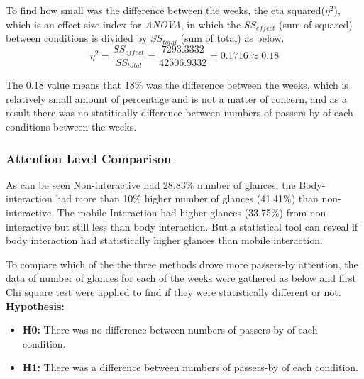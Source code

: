 To find how small was the difference between the weeks, the eta squared(${\eta}^2$), which is an effect size index for \emph{ANOVA}, in which the $SS_{effect}$ (sum of squared) between conditions is divided by $SS_{total}$  (sum of total) as below.
\[
{\eta}^2 = \frac{{SS}_{effect}}{{SS}_{total}} = \frac{7293.3332}{42506.9332} = 0.1716\approx 0.18
\]

The 0.18 value means that 18\% was the difference between the weeks, which is relatively small amount of percentage and is not a matter of concern, and as a result there was no statitically difference between numbers of passers-by of each conditions between the weeks.




\subsubsection {Attention Level Comparison}
As can be seen Non-interactive had 28.83\% number of glances, the Body-interaction had more than 10\% higher number of glances (41.41\%) than non-interactive, The mobile Interaction had higher glances (33.75\%) from non-interactive but still less than body interaction.  But a statistical tool can reveal if body interaction had statistically higher glances than mobile interaction.

To compare which of the the three methods drove more passers-by attention, the data of number of glances for each of the weeks were gathered as below and first Chi square test were applied to find if they were statistically different or not.\\

\textbf{Hypothesis: }
\begin{itemize}
\item \textbf{H0:} There was no difference between numbers of passers-by of each condition.
\item \textbf{H1:} There was a difference between numbers of passers-by of each condition.
\end{itemize}

\begin{table}[H]
\caption{Cross tabulation for each week attention level }
\label{tab:crosstabulationweeks}
\centering
{}
\end{table}


